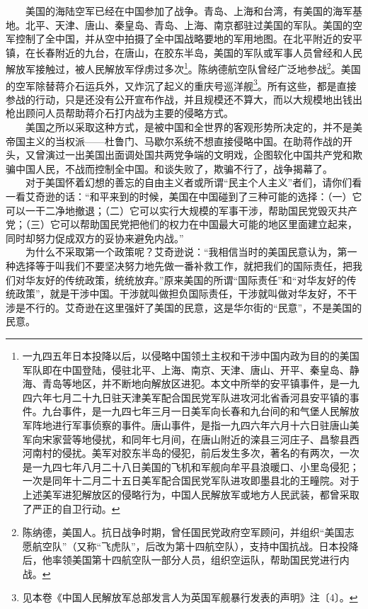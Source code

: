 \documentclass[cn,11pt,chinese]{elegantbook}
\begin{document}
　　美国的海陆空军已经在中国参加了战争。青岛、上海和台湾，有美国的海军基地。北平、天津、唐山、秦皇岛、青岛、上海、南京都驻过美国的军队。美国的空军控制了全中国，并从空中拍摄了全中国战略要地的军用地图。在北平附近的安平镇，在长春附近的九台，在唐山，在胶东半岛，美国的军队或军事人员曾经和人民解放军接触过，被人民解放军俘虏过多次\footnote[2]{ 一九四五年日本投降以后，以侵略中国领土主权和干涉中国内政为目的的美国军队即在中国登陆，侵驻北平、上海、南京、天津、唐山、开平、秦皇岛、静海、青岛等地区，并不断地向解放区进犯。本文中所举的安平镇事件，是一九四六年七月二十九日驻天津美军配合国民党军队进攻河北省香河县安平镇的事件。九台事件，是一九四七年三月一日美军向长春和九台间的和气堡人民解放军阵地进行军事侦察的事件。唐山事件，是指一九四六年六月十六日驻唐山美军向宋家营等地侵扰，和同年七月间，在唐山附近的滦县三河庄子、昌黎县西河南村的侵扰。美军对胶东半岛的侵犯，前后发生多次，著名的有两次，一次是一九四七年八月二十八日美国的飞机和军舰向牟平县浪暖口、小里岛侵犯；一次是同年十二月二十五日美军配合国民党军队进攻即墨县北的王疃院。对于上述美军进犯解放区的侵略行为，中国人民解放军或地方人民武装，都曾采取了严正的自卫行动。}。陈纳德航空队曾经广泛地参战\footnote[3]{ 陈纳德，美国人。抗日战争时期，曾任国民党政府空军顾问，并组织“美国志愿航空队”（又称“飞虎队”，后改为第十四航空队），支持中国抗战。日本投降后，他率领美国第十四航空队一部分人员，组织空运队，帮助国民党进行内战。}。美国的空军除替蒋介石运兵外，又炸沉了起义的重庆号巡洋舰\footnote[4]{ 见本卷《中国人民解放军总部发言人为英国军舰暴行发表的声明》注〔4〕。}。所有这些，都是直接参战的行动，只是还没有公开宣布作战，并且规模还不算大，而以大规模地出钱出枪出顾问人员帮助蒋介石打内战为主要的侵略方式。\\
　　美国之所以采取这种方式，是被中国和全世界的客观形势所决定的，并不是美帝国主义的当权派——杜鲁门、马歇尔系统不想直接侵略中国。在助蒋作战的开头，又曾演过一出美国出面调处国共两党争端的文明戏，企图软化中国共产党和欺骗中国人民，不战而控制全中国。和谈失败了，欺骗不行了，战争揭幕了。\\
　　对于美国怀着幻想的善忘的自由主义者或所谓“民主个人主义”者们，请你们看一看艾奇逊的话：“和平来到的时候，美国在中国碰到了三种可能的选择：（一）它可以一干二净地撤退；（二）它可以实行大规模的军事干涉，帮助国民党毁灭共产党；（三）它可以帮助国民党把他们的权力在中国最大可能的地区里面建立起来，同时却努力促成双方的妥协来避免内战。”\\
　　为什么不采取第一个政策呢？艾奇逊说：“我相信当时的美国民意认为，第一种选择等于叫我们不要坚决努力地先做一番补救工作，就把我们的国际责任，把我们对华友好的传统政策，统统放弃。”原来美国的所谓“国际责任”和“对华友好的传统政策”，就是干涉中国。干涉就叫做担负国际责任，干涉就叫做对华友好，不干涉是不行的。艾奇逊在这里强奸了美国的民意，这是华尔街的“民意”，不是美国的民意。\\
\end{document}
